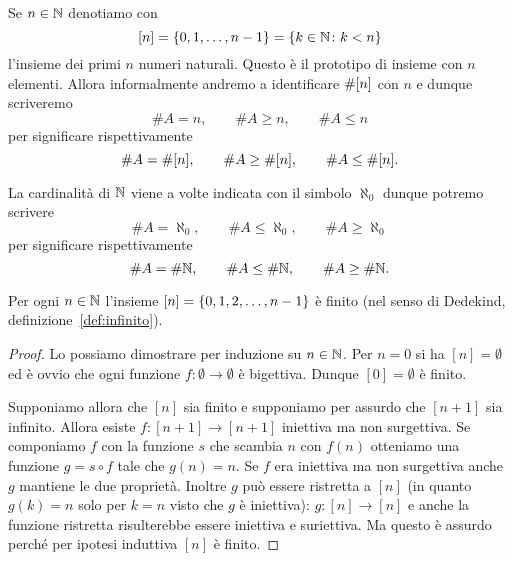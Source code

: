 \begin{definition}
Se $n\in {\mathbb N}$ denotiamo con 
\[
  {\left[ n \right]} 
  = {\left\{ 0,1,\dots, n-1 \right\}}
  = {\left\{ k\in {\mathbb N}\colon k<n \right\}}
\]
l'insieme dei primi $n$ numeri naturali. 
Questo è il prototipo di insieme con $n$ elementi.
Allora informalmente andremo a identificare $\#{\left[ n \right]}$ con $n$ e 
dunque scriveremo 
\[
   \#A = n, \qquad \#A\ge n, \qquad \#A\le n
\]
per significare rispettivamente
\[
  \#A = \#{\left[ n \right]}, \qquad \#A \ge \#{\left[ n \right]}, \qquad \#A\le \#{\left[ n \right]}.  
\]

La cardinalità di ${\mathbb N}$ viene a volte indicata con il simbolo
%
%
$\aleph_0$ dunque potremo scrivere  
%
\[
    \# A = \aleph_0, \qquad
    \#A \le \aleph_0, \qquad
    \# A\ge \aleph_0
\]
per significare rispettivamente 
\[
  \# A = \# {\mathbb N}, \qquad
  \# A \le \# {\mathbb N}, \qquad
  \# A \ge \# {\mathbb N}.  
\]
\end{definition}
  
\begin{lemma}\label{lm:nfinito}
Per ogni $n\in {\mathbb N}$ l'insieme $[n]={\left\{ 0,1,2, \dots, n-1 \right\}}$ è 
finito (nel senso di Dedekind, definizione~\ref{def:infinito}).
\end{lemma}
%
\begin{proof}
Lo possiamo dimostrare per induzione su $n\in {\mathbb N}$.
Per $n=0$ si ha $[n]=\emptyset$ ed è ovvio che ogni funzione 
$f\colon \emptyset \to \emptyset$ è bigettiva. 
Dunque $[0]=\emptyset$ è finito.

Supponiamo allora che $[n]$ sia finito e supponiamo per assurdo che $[n+1]$ sia 
infinito.
Allora esiste $f\colon [n+1]\to[n+1]$ iniettiva ma non surgettiva. 
Se componiamo $f$ con la funzione $s$ che scambia $n$ con $f(n)$ otteniamo 
una funzione $g = s\circ f$ tale che $g(n)=n$.
Se $f$ era iniettiva ma non surgettiva anche $g$ mantiene le due proprietà.
Inoltre $g$ può essere ristretta a $[n]$ (in quanto $g(k)=n$ solo per $k=n$ 
visto che $g$ è iniettiva): $g\colon [n]\to [n]$
e anche la funzione ristretta risulterebbe essere iniettiva e suriettiva.
Ma questo è assurdo perché per ipotesi induttiva $[n]$ è finito.
\end{proof}

